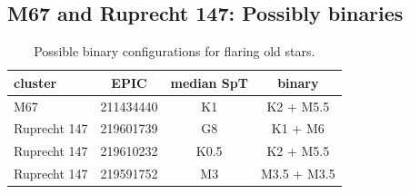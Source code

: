 \documentclass{aa}
\begin{document}
\subsection{M67 and Ruprecht 147: Possibly binaries}
\label{sec:m67r147}
\begin{table}

\caption{Possible binary configurations for flaring old stars.}
\label{tab:m67_rup147_binaries}
\centering
\begin{tabular}{lccc}
\hline\hline
 cluster & EPIC & median SpT &     binary \\
\hline
     M67 &  211434440 &         K1 &    K2 + M5.5 \\
 Ruprecht 147 &  219601739 &         G8 &      K1 + M6 \\
 Ruprecht 147 &  219610232 &       K0.5 &    K2 + M5.5 \\
 Ruprecht 147 &  219591752 &         M3 &  M3.5 + M3.5 \\
\hline
\end{tabular}
\end{table}
\end{document}
